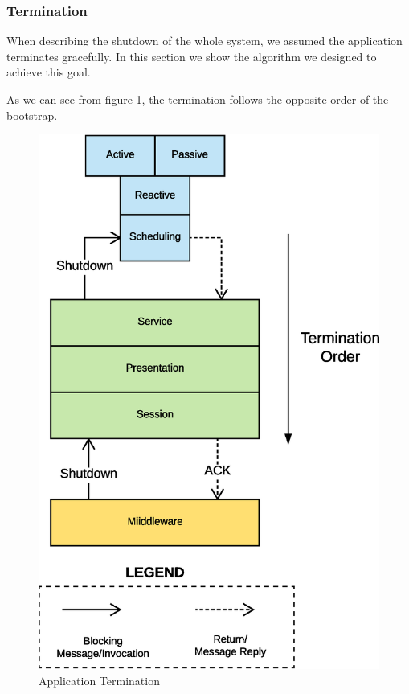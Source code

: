 \subsubsection{Termination}

When describing the shutdown of the whole system, we assumed the application
terminates gracefully.
In this section we show the algorithm we designed to achieve this goal.

As we can see from figure \ref{fig:termination-app}, the termination follows the
opposite order of the bootstrap.

\begin{figure}[H]
  \centering
  \includegraphics[scale=0.4,keepaspectratio]
    {images/solution/termination-app.eps}
  \caption{Application Termination}
  \label{fig:termination-app}
\end{figure}

